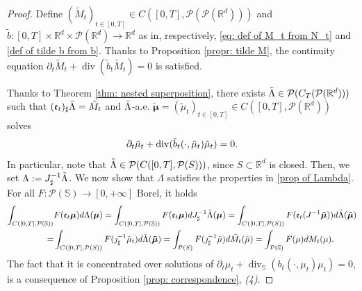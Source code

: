 \documentclass[10pt,leqno]{amsart}
\numberwithin{equation}{section}
\newtheorem{oss}[teorema]{Remark}
\newcommand{\R}{\mathbb{R}}
\newcommand{\PP}{\mathcal{P}}
\newcommand{\Ss}{\mathbb{S}}
\begin{document}


\begin{proof}
    Define $(\tilde{M}_t)_{t\in[0,T]} \in C([0,T],\PP(\PP(\R^d)))$ and $\tilde{b}:[0,T]\times \R^d \times \PP(\R^d) \to \R^d$ as in, respectively, \eqref{eq: def of M_t from N_t} and \eqref{def of tilde b from b}. Thanks to Proposition \ref{propr: tilde M}, the continuity equation $\partial_t\tilde{M}_t + \operatorname{div}(\tilde{b}_t\tilde{M}_t) = 0$ is satisfied. 

Thanks to Theorem \ref{thm: nested superposition}, there exists $\Tilde{\Lambda}\in \PP(C_T(\PP(\R^d)))$ such that $(\mathfrak{e}_t)_\sharp\Tilde{\Lambda}= \tilde{M}_t$ and $\Tilde{\Lambda}$-a.e. $\boldsymbol{\tilde\mu}=(\tilde\mu_t)_{t\in [0,T]}\in C([0,T],\PP(\R^d))$ solves 
\begin{equation*}
    \partial_t\tilde\mu_t +\operatorname{div}(\Tilde{b}_t(\cdot,\tilde\mu_t)\tilde\mu_t)= 0.
\end{equation*}
In particular, note that $\Tilde{\Lambda} \in \PP(C([0,T],\PP(S)))$, since $S\subset \R^d$ is closed.
Then, we set $\Lambda:= J^{-1}_\sharp \Tilde{\Lambda}$. We now show that $\Lambda$ satisfies the properties in \ref{prop of Lambda}. For all $F:\PP(\Ss)\to [0,+\infty]$ Borel, it holds
\begin{align*}
    \int_{C([0,T],\PP(\Ss))} &F(\mathfrak{e}_t\boldsymbol{\mu}) d\Lambda(\boldsymbol{\mu}) 
    = 
    \int_{C([0,T],\PP(\Ss))} F(\mathfrak{e}_t\boldsymbol{\mu})  dJ^{-1}_\sharp\Tilde{\Lambda}(\boldsymbol{\mu})
    = 
    \int_{C([0,T],\PP(S))} F(\mathfrak{e}_t(J^{-1}\boldsymbol{\tilde\mu})) d\Tilde{\Lambda}(\boldsymbol{\tilde\mu})
    \\
    = &
    \int_{C([0,T],\PP(S))} F(\jmath^{-1}_\sharp\tilde\mu_t) d\Tilde{\Lambda}(\boldsymbol{\tilde\mu}) 
    = 
    \int_{\PP(S)} F(\jmath^{-1}_\sharp \tilde\mu) d\tilde{M}_t(\tilde\mu) 
    =
    \int_{\PP(\Ss)} F(\mu) dM_t(\mu).
\end{align*}
The fact that it is concentrated over solutions of $\partial_t \mu_t + \operatorname{div}_\Ss(b_t(\cdot,\mu_t)\mu_t) = 0$, is a consequence of Proposition \ref{prop: correspondence}, \textit{(4)}.




\end{proof}
\end{document}
